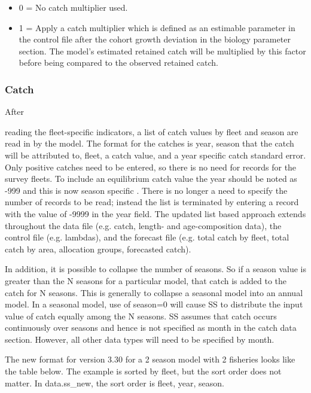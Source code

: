 \begin{description}
	  \begin{itemize}
	  	\item 0 = No catch multiplier used.
	  	\item 1 = Apply a catch multiplier which is defined as an estimable parameter in the control file after the cohort growth deviation in the biology parameter section. The model’s estimated retained catch will be multiplied by this factor before being compared to the observed retained catch.
	  \end{itemize}  
\end{description}

\subsubsection{Catch}
\hypertarget{CatchFormat}{After} reading the fleet-specific indicators, a list of catch values by fleet and season are read in by the model.  The format for the catches is year, season that the catch will be attributed to, fleet, a catch value, and a year specific catch standard error.   Only positive catches need to be entered, so there is no need for records for the survey fleets.  To include an equilibrium catch value the year should be noted as -999 and this is now season specific .  \hypertarget{ListBased}{There} is no longer a need to specify the number of records to be read; instead the list is terminated by entering a record with the value of -9999 in the year field. The updated list based approach extends throughout the data file (e.g. catch, length- and age-composition data), the control file (e.g. lambdas), and the forecast file (e.g. total catch by fleet, total catch by area, allocation groups, forecasted catch).

In addition, it is possible to collapse the number of seasons.  So if a season value is greater than the N seasons for a particular model, that catch is added to the catch for N seasons.  This is generally to collapse a seasonal model into an annual model.  In a seasonal model, use of season=0 will cause SS to distribute the input value of catch equally among the N seasons.  SS assumes that catch occurs continuously over seasons and hence is not specified as month in the catch data section.  However, all other data types will need to be specified by month.

The new format for version 3.30 for a 2 season model with 2 fisheries looks like the table below.  The example is sorted by fleet, but the sort order does not matter.  In data.ss\_new, the sort order is fleet, year, season.

